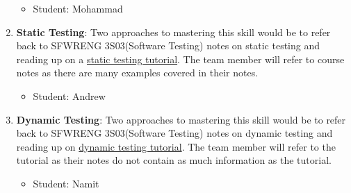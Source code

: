 \documentclass[12pt, titlepage]{article}
\begin{document}
\begin{enumerate}
        \begin{itemize}
                \item Student: Mohammad 
            \end{itemize}
    \item \textbf{Static Testing}: Two approaches to mastering this skill would be to refer back to SFWRENG 3S03(Software Testing) notes on static testing and reading up on a \href{https://www.javatpoint.com/static-testing}{static testing tutorial}. The team member will refer to course notes as there are many examples covered in their notes.
        \begin{itemize}
                \item Student: Andrew 
            \end{itemize}
    \item \textbf{Dynamic Testing}: Two approaches to mastering this skill would be to refer back to SFWRENG 3S03(Software Testing) notes on dynamic testing and reading up on \href{https://www.guru99.com/dynamic-testing.html}{dynamic testing tutorial}. The team member will refer to the tutorial as their notes do not contain as much information as the tutorial.
        \begin{itemize}
                \item Student: Namit
            \end{itemize}
\end{enumerate}
\end{document}
